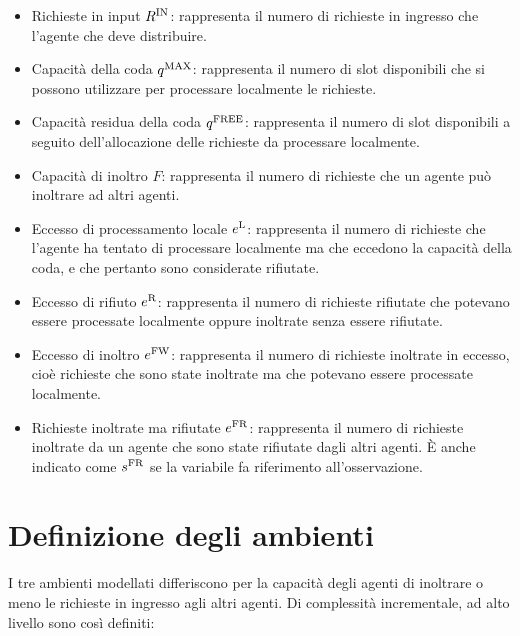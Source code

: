 \begin{itemize}
    \item Richieste in input $R^\textnormal{IN}$: rappresenta il numero di richieste in ingresso che l'agente che deve distribuire.

    \item Capacità della coda $q^\textnormal{MAX}$: rappresenta il numero di slot disponibili che si possono utilizzare per processare localmente le richieste.

    \item Capacità residua della coda $q^\textnormal{FREE}$: rappresenta il numero di slot disponibili a seguito dell'allocazione delle richieste da processare localmente.

    \item Capacità di inoltro $F$: rappresenta il numero di richieste che un agente può inoltrare ad altri agenti.

    \item Eccesso di processamento locale $e^\textnormal{L}$: rappresenta il numero di richieste che l'agente ha tentato di processare localmente ma che eccedono la capacità della coda, e che pertanto sono considerate rifiutate.

    \item Eccesso di rifiuto $e^\textnormal{R}$: rappresenta il numero di richieste rifiutate che potevano essere processate localmente oppure inoltrate senza essere rifiutate.

    \item Eccesso di inoltro $e^\textnormal{FW}$: rappresenta il numero di richieste inoltrate in eccesso, cioè richieste che sono state inoltrate ma che potevano essere processate localmente.

    \item Richieste inoltrate ma rifiutate $e^\textnormal{FR}$: rappresenta il numero di richieste inoltrate da un agente che sono state rifiutate dagli altri agenti. È anche indicato come $s^\textnormal{FR}$ se la variabile fa riferimento all'osservazione.
\end{itemize}

\section{Definizione degli ambienti}
\label{sec:4_environments}

I tre ambienti modellati differiscono per la capacità degli agenti di inoltrare o meno le richieste in ingresso agli altri agenti. Di complessità incrementale, ad alto livello sono così definiti:

